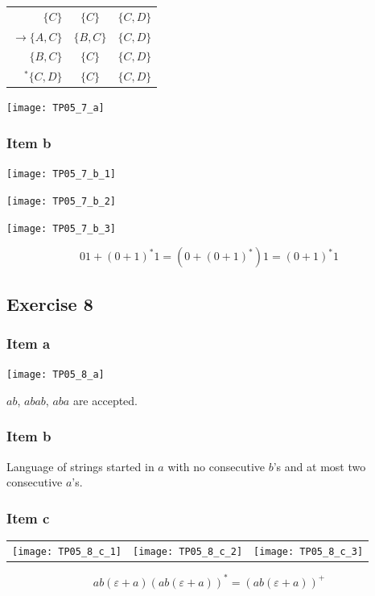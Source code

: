 {\begin{center}
\begin{minipage}[c]{0.32\textwidth}
\begin{center}
\begin{tabular}{r | c c}
	$            \{C  \}$ & $\{C  \}$ & $\{C,D\}$ \\	
	$\rightarrow \{A,C\}$ & $\{B,C\}$ & $\{C,D\}$ \\
	$            \{B,C\}$ & $\{C  \}$ & $\{C,D\}$ \\
	$      ^* \{C,D\}$ & $\{C  \}$ & $\{C,D\}$
\end{tabular} \end{center}
\end{minipage}%
\begin{minipage}[c]{0.24\textwidth}
	\begin{center} \texttt{[image: TP05\_7\_a]} \end{center}
\end{minipage}
\end{center}
\subsubsection{Item b}
\begin{center} \texttt{[image: TP05\_7\_b\_1]} \end{center}
\begin{center} \texttt{[image: TP05\_7\_b\_2]} \end{center}
\begin{center} \texttt{[image: TP05\_7\_b\_3]} \end{center}
\begin{equation*}
	01+(0+1)^* 1 = (0+(0+1)^*) 1 = (0+1)^* 1
\end{equation*}
\pagebreak
\subsection{Exercise 8}
\subsubsection{Item a}
\begin{center} \texttt{[image: TP05\_8\_a]} \end{center}
$ab$, $abab$, $aba$ are accepted.
\subsubsection{Item b}
Language of strings started in $a$ with no consecutive $b$'s and at most two consecutive $a$'s.
\subsubsection{Item c}
\begin{center} \begin{tabular}{c c c}
\texttt{[image: TP05\_8\_c\_1]} &
\texttt{[image: TP05\_8\_c\_2]} &
\texttt{[image: TP05\_8\_c\_3]} 
\end{tabular} \end{center}
\begin{equation*}
	ab(\varepsilon+a)(ab(\varepsilon+a))^*=(ab(\varepsilon+a))^+
\end{equation*}
}
